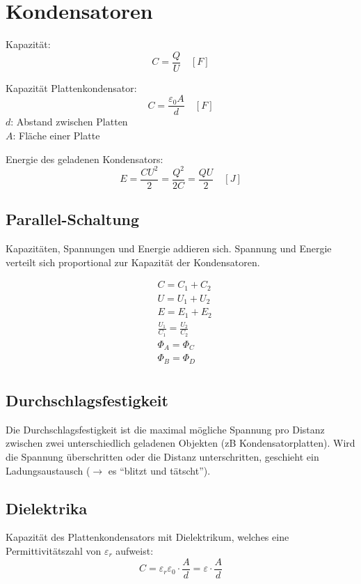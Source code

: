 \section{Kondensatoren}

Kapazität:
\[
	C = \frac{Q}{U} \quad \left[F\right]
\]

Kapazität Plattenkondensator:
\[
	C = \frac{\varepsilon_0 A}{d} \quad \left[F\right]
\]
$d$: Abstand zwischen Platten\\
$A$: Fläche einer Platte

Energie des geladenen Kondensators:
\[
	E = \frac{CU^2}{2} = \frac{Q^2}{2C} = \frac{QU}{2} \quad \left[J\right]
\]

\subsection{Parallel-Schaltung}

Kapazitäten, Spannungen und Energie addieren sich. Spannung und Energie verteilt
sich proportional zur Kapazität der Kondensatoren.

\begin{minipage}{.5\linewidth}
	
\end{minipage}
\begin{minipage}{.5\linewidth}
	\begin{align*}
		& C = C_1 + C_2 \\
		& U = U_1 + U_2 \\
		& E = E_1 + E_2 \\
		& \frac{U_1}{C_1} = \frac{U_2}{C_2} \\
		& \Phi_A = \Phi_C \\
		& \Phi_B = \Phi_D \\
	\end{align*}
\end{minipage}

\subsection{Durchschlagsfestigkeit}

Die Durchschlagsfestigkeit ist die maximal mögliche Spannung pro Distanz
zwischen zwei unterschiedlich geladenen Objekten (zB Kondensatorplatten). Wird
die Spannung überschritten oder die Distanz unterschritten, geschieht ein
Ladungsaustausch ($\rightarrow$ es "`blitzt und tätscht"').

\subsection{Dielektrika}

Kapazität des Plattenkondensators mit Dielektrikum, welches eine
Permittivitätszahl von $\varepsilon_r$ aufweist:
\[
	C = \varepsilon_r \varepsilon_0 \cdot \frac{A}{d} = \varepsilon \cdot \frac{A}{d}
\]
